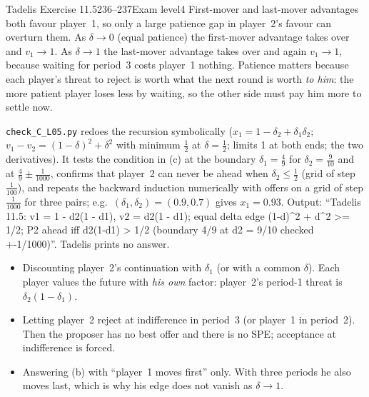 \begin{exsol}{Tadelis Exercise 11.5}{236--237}{Exam level}{4}
\interp First-mover and last-mover advantages both favour player~1, so only a large patience gap
in player~2's favour can overturn them. As $\delta \to 0$ (equal patience) the first-mover
advantage takes over and $v_1 \to 1$. As $\delta \to 1$ the last-mover advantage takes over and again
$v_1 \to 1$, because waiting for period~3 costs player~1 nothing. Patience matters because each
player's threat to reject is worth what the next round is worth \emph{to him}: the more patient
player loses less by waiting, so the other side must pay him more to settle now.

\verify \texttt{check\_C\_L05.py} redoes the recursion symbolically ($x_1 = 1 - \delta_2 +
\delta_1\delta_2$; $v_1 - v_2 = (1-\delta)^2 + \delta^2$ with minimum $\frac12$ at $\delta = \frac12$; limits
1 at both ends; the two derivatives). It tests the condition in (c) at the boundary $\delta_1 =
\frac49$ for $\delta_2 = \frac9{10}$ and at $\frac49 \pm \frac1{1000}$, confirms that player~2 can never be
ahead when $\delta_2 \le \frac12$ (grid of step $\frac1{100}$), and repeats the backward induction
numerically with offers on a grid of step $\frac1{1000}$ for three pairs; e.g.\ $(\delta_1,\delta_2) =
(0.9, 0.7)$ gives $x_1 = 0.93$. Output: ``Tadelis 11.5: v1 = 1 - d2(1 - d1), v2 = d2(1 - d1); equal
delta edge (1-d)\^{}2 + d\^{}2 >= 1/2; P2 ahead iff d2(1-d1) > 1/2 (boundary 4/9 at d2 = 9/10 checked
+-1/1000)''. Tadelis prints no answer.

\mistakes
\begin{itemize}
  \item Discounting player~2's continuation with $\delta_1$ (or with a common $\delta$). Each player
  values the future with \emph{his own} factor: player~2's period-1 threat is $\delta_2(1-\delta_1)$.
  \item Letting player~2 reject at indifference in period~3 (or player~1 in period~2). Then the
  proposer has no best offer and there is no SPE; acceptance at indifference is forced.
  \item Answering (b) with ``player~1 moves first'' only. With three periods he also moves last, which
  is why his edge does not vanish as $\delta \to 1$.
\end{itemize}

\end{exsol}
